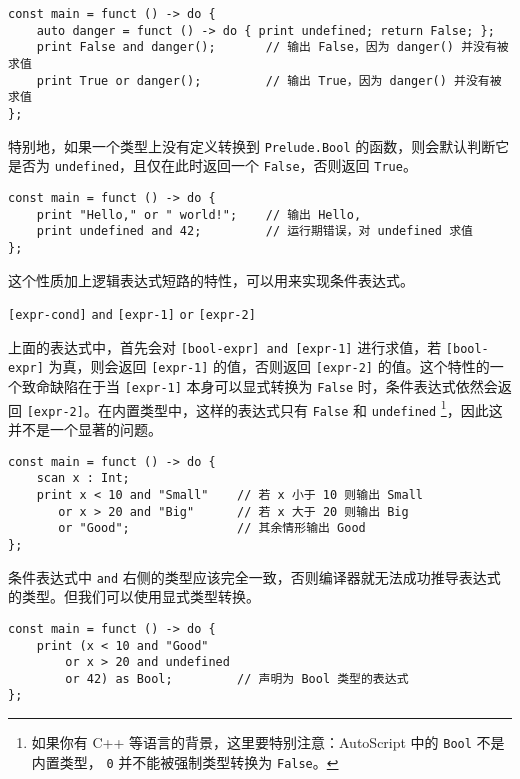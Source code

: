 \begin{lstlisting}
const main = funct () -> do {
	auto danger = funct () -> do { print undefined; return False; };
    print False and danger();		// 输出 False，因为 danger() 并没有被求值
    print True or danger();			// 输出 True，因为 danger() 并没有被求值
};
\end{lstlisting}

特别地，如果一个类型上没有定义转换到 \lstinline!Prelude.Bool! 的函数，则会默认判断它是否为 \lstinline!undefined!，且仅在此时返回一个 \lstinline!False!，否则返回 \lstinline!True!。

\begin{lstlisting}
const main = funct () -> do {
	print "Hello," or " world!";	// 输出 Hello,
	print undefined and 42;			// 运行期错误，对 undefined 求值
};
\end{lstlisting}

这个性质加上逻辑表达式短路的特性，可以用来实现条件表达式。

\begin{grammar} \label{grm:conditional-expression}
    \texttt{[expr-cond]} \lstinline!and! \texttt{[expr-1]} \lstinline!or! \texttt{[expr-2]}
\end{grammar}

上面的表达式中，首先会对 \lstinline![bool-expr] and [expr-1]! 进行求值，若 \lstinline![bool-expr]! 为真，则会返回 \lstinline![expr-1]! 的值，否则返回 \lstinline![expr-2]! 的值。这个特性的一个致命缺陷在于当 \lstinline![expr-1]! 本身可以显式转换为 \lstinline!False! 时，条件表达式依然会返回 \lstinline![expr-2]!。在内置类型中，这样的表达式只有 \lstinline!False! 和 \lstinline!undefined! \footnote{如果你有 C++ 等语言的背景，这里要特别注意：AutoScript 中的 \lstinline!Bool! 不是内置类型， \lstinline!0! 并不能被强制类型转换为 \lstinline!False!。}，因此这并不是一个显著的问题。

\begin{lstlisting}
const main = funct () -> do {
    scan x : Int;
    print x < 10 and "Small"    // 若 x 小于 10 则输出 Small
       or x > 20 and "Big"      // 若 x 大于 20 则输出 Big
       or "Good";               // 其余情形输出 Good
};
\end{lstlisting}

条件表达式中 \lstinline!and! 右侧的类型应该完全一致，否则编译器就无法成功推导表达式的类型。但我们可以使用显式类型转换。

\begin{lstlisting}
const main = funct () -> do {
	print (x < 10 and "Good"
		or x > 20 and undefined
		or 42) as Bool;			// 声明为 Bool 类型的表达式
};
\end{lstlisting}

